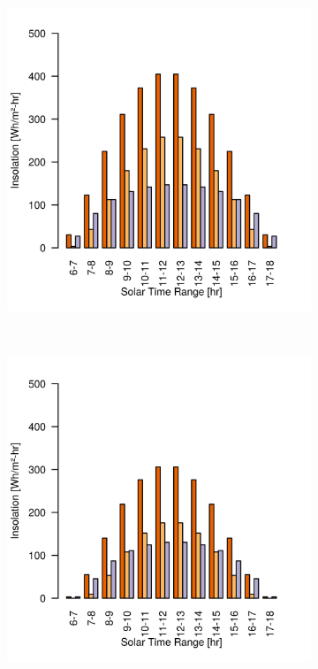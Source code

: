 \begin{figure}[h]
\begin{subfigure}[t]{\subfigureWidth}
  		\includegraphics[height=\graphicsHeight]{sections/martian-environment/plots/ih-ibh-and-idh-variation-2-for-ls-71-phi-0-tau-05-and-albedo-027}
  		\label{fig:sub:insolation-phi-m20}
  	\end{subfigure}\\[0.8ex]
    \begin{subfigure}[t]{\subfigureWidth}
      \centering
  		\includegraphics[height=\graphicsHeight]{sections/martian-environment/plots/ih-ibh-and-idh-variation-3-for-ls-71-phi-20-tau-05-and-albedo-027}

\end{subfigure}
\end{figure}
